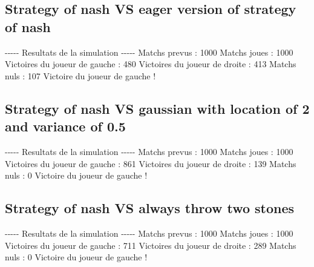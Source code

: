 \documentclass{article}%
\begin{document}
%
\subsection{Strategy of nash VS eager version of strategy of nash}%
\label{subsec:Strategy of nash VS eager version of strategy of nash}%
{-}{-}{-}{-}{-} Resultats de la simulation {-}{-}{-}{-}{-}\newline%
		\newline%
Matchs prevus : 1000\newline%
Matchs joues : 1000\newline%
\newline%
Victoires du joueur de gauche : 480\newline%
Victoires du joueur de droite : 413\newline%
Matchs nuls : 107\newline%
\newline%
Victoire du joueur de gauche !

%
\subsection{Strategy of nash VS gaussian with location of 2 and variance of 0.5}%
\label{subsec:Strategy of nash VS gaussian with location of 2 and variance of 0.5}%
{-}{-}{-}{-}{-} Resultats de la simulation {-}{-}{-}{-}{-}\newline%
		\newline%
Matchs prevus : 1000\newline%
Matchs joues : 1000\newline%
\newline%
Victoires du joueur de gauche : 861\newline%
Victoires du joueur de droite : 139\newline%
Matchs nuls : 0\newline%
\newline%
Victoire du joueur de gauche !

%
\subsection{Strategy of nash VS always throw two stones}%
\label{subsec:Strategy of nash VS always throw two stones}%
{-}{-}{-}{-}{-} Resultats de la simulation {-}{-}{-}{-}{-}\newline%
		\newline%
Matchs prevus : 1000\newline%
Matchs joues : 1000\newline%
\newline%
Victoires du joueur de gauche : 711\newline%
Victoires du joueur de droite : 289\newline%
Matchs nuls : 0\newline%
\newline%
Victoire du joueur de gauche !
\end{document}
